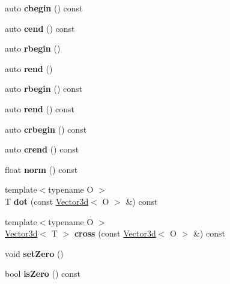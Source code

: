 \begin{DoxyCompactItemize}
auto {\bfseries cbegin} () const
\item 
\mbox{\label{classenhance_1_1Vector3d_ad62c9df3053fb3556ace45bb5b1c2c0e}} 
auto {\bfseries cend} () const
\item 
\mbox{\label{classenhance_1_1Vector3d_a1c1d6cd87f4cb8c4dcead3923575a57d}} 
auto {\bfseries rbegin} ()
\item 
\mbox{\label{classenhance_1_1Vector3d_a6a97f9a75cfde7d24657f24e5b04556c}} 
auto {\bfseries rend} ()
\item 
\mbox{\label{classenhance_1_1Vector3d_a076eef19933c1e90237ce466511b867c}} 
auto {\bfseries rbegin} () const
\item 
\mbox{\label{classenhance_1_1Vector3d_ad66092240cc90be5d9539e082af96298}} 
auto {\bfseries rend} () const
\item 
\mbox{\label{classenhance_1_1Vector3d_a06ab8677208966dacba935db0fbdecfb}} 
auto {\bfseries crbegin} () const
\item 
\mbox{\label{classenhance_1_1Vector3d_a74beabb38c536d232db01529ab4c872d}} 
auto {\bfseries crend} () const
\item 
\mbox{\label{classenhance_1_1Vector3d_a3fcb5baa3320c241e8e07d1bcff235af}} 
float {\bfseries norm} () const
\item 
\mbox{\label{classenhance_1_1Vector3d_a776ae8af961aa74c79f9daa254f19bf6}} 
{\footnotesize template$<$typename O $>$ }\\T {\bfseries dot} (const \mbox{\hyperlink{classenhance_1_1Vector3d}{Vector3d}}$<$ O $>$ \&) const
\item 
\mbox{\label{classenhance_1_1Vector3d_adf1041d6815b6d3c304866309b246461}} 
{\footnotesize template$<$typename O $>$ }\\\mbox{\hyperlink{classenhance_1_1Vector3d}{Vector3d}}$<$ T $>$ {\bfseries cross} (const \mbox{\hyperlink{classenhance_1_1Vector3d}{Vector3d}}$<$ O $>$ \&) const
\item 
\mbox{\label{classenhance_1_1Vector3d_a19492f5b72c825f70d0aba9756c3f975}} 
void {\bfseries set\+Zero} ()
\item 
\mbox{\label{classenhance_1_1Vector3d_aded32944fc5b42b51b6bb36e5ea4a73a}} 
bool {\bfseries is\+Zero} () const
\end{DoxyCompactItemize}
